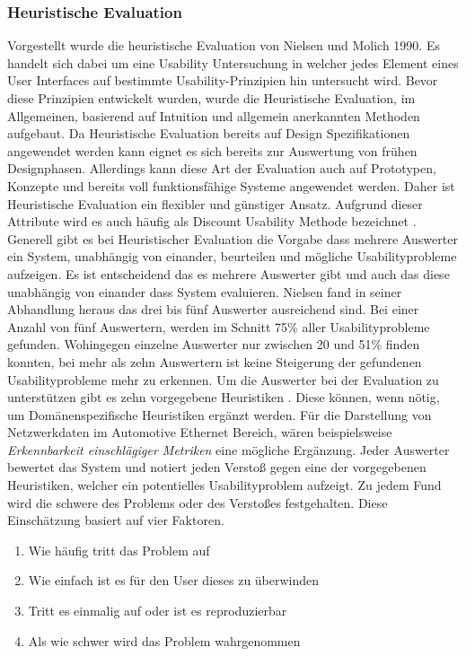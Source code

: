 \documentclass[draft=false
              ,paper=a4
              ,twoside=false
              ,fontsize=11pt
              ,headsepline
              ,BCOR10mm
              ,DIV11
              ]{scrbook}
\begin{document}
\subsubsection{Heuristische Evaluation} %
\label{ssub:heuristische_evaluation}
Vorgestellt wurde die heuristische Evaluation von Nielsen und Molich \cite{nielsen_heuristic_1990} 1990. Es handelt sich dabei um eine Usability Untersuchung in welcher jedes Element eines User Interfaces auf bestimmte Usability-Prinzipien hin untersucht wird. Bevor diese Prinzipien entwickelt wurden, wurde die Heuristische Evaluation, im Allgemeinen, basierend auf Intuition und allgemein anerkannten Methoden aufgebaut. Da Heuristische Evaluation bereits auf Design Spezifikationen angewendet werden kann eignet es sich bereits zur Auswertung von frühen Designphasen. Allerdings kann diese Art der Evaluation auch auf Prototypen, Konzepte und bereits voll funktionsfähige Systeme angewendet werden. Daher ist Heuristische Evaluation ein flexibler und günstiger Ansatz. Aufgrund dieser Attribute wird es auch häufig als Discount Usability Methode bezeichnet \cite{kane_finding_2003}\cite{nielsen_usability_1994}.
Generell gibt es bei Heuristischer Evaluation die Vorgabe dass mehrere Auswerter ein System, unabhängig von einander, beurteilen und mögliche Usabilityprobleme aufzeigen. Es ist entscheidend das es mehrere Auswerter gibt und auch das diese unabhängig von einander dass System evaluieren. Nielsen fand in seiner Abhandlung heraus das drei bis fünf Auswerter ausreichend sind. Bei einer Anzahl von fünf Auswertern, werden im Schnitt 75\% aller Usabilityprobleme gefunden. Wohingegen einzelne Auswerter nur zwischen 20 und 51\% finden konnten, bei mehr als zehn Auswertern ist keine Steigerung der gefundenen Usabilityprobleme mehr zu erkennen.
Um die Auswerter bei der Evaluation zu unterstützen gibt es zehn vorgegebene Heuristiken \cite{nielsen_usability_1994}. Diese können, wenn nötig, um Domänenspezifische Heuristiken ergänzt werden. Für die Darstellung von Netzwerkdaten im Automotive Ethernet Bereich, wären beispielsweise \textit{Erkennbarkeit einschlägiger Metriken} eine mögliche Ergänzung. 
Jeder Auswerter bewertet das System und notiert jeden Verstoß gegen eine der vorgegebenen Heuristiken, welcher ein potentielles Usabilityproblem aufzeigt. Zu jedem Fund wird die schwere des Problems oder des Verstoßes festgehalten. Diese Einschätzung basiert auf vier Faktoren.

\begin{enumerate}
  \item Wie häufig tritt das Problem auf
  \item Wie einfach ist es für den User dieses zu überwinden
  \item Tritt es einmalig auf oder ist es reproduzierbar
  \item Als wie schwer wird das Problem wahrgenommen
\end{enumerate}
\end{document}
